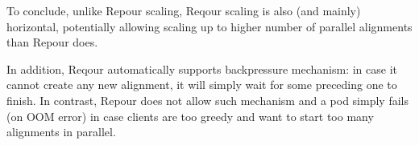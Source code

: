 \documentclass[../main.tex]{subfiles}
\begin{document}
To conclude, unlike Repour scaling, Reqour scaling is also (and mainly) horizontal, potentially allowing scaling up to higher number of parallel alignments than Repour does.

In addition, Reqour automatically supports backpressure mechanism: in case it cannot create any new alignment, it will simply wait for some preceding one to finish. In contrast, Repour does not allow such mechanism and a pod simply fails (on OOM error) in case clients are too greedy and want to start too many alignments in parallel.
\end{document}

